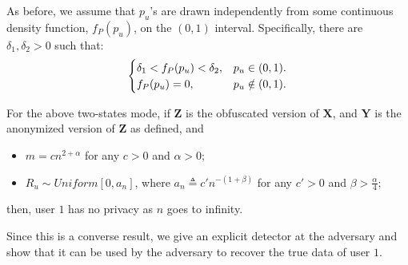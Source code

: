 As before, we assume that $p_u$'s are drawn independently from some continuous density function, $f_P(p_u)$, on the $(0,1)$ interval. Specifically, there are $\delta_1, \delta_2>0$ such that:%
\begin{equation}
\nonumber\begin{cases}
    \delta_1<f_P(p_u) <\delta_2, & p_u \in (0,1).\\
    f_P(p_u)=0, &  p _u\notin (0,1).
\end{cases}
\end{equation}

\begin{thm}\label{two_state_thm_converse}
For the above two-states mode, if $\textbf{Z}$ is the obfuscated version of $\textbf{X}$, and $\textbf{Y}$ is the anonymized version of $\textbf{Z}$ as defined, and
\begin{itemize}
	\item $m =cn^{2 +  \alpha}$ for any $c>0$ and $\alpha>0$;
	\item $R_u \sim Uniform [0, a_n]$, where $a_n \triangleq c'n^{-\left(1+\beta\right)}$ for any $c'>0$ and $\beta>\frac{\alpha}{4}$;
\end{itemize}
then, user $1$ has no privacy as $n$ goes to infinity.
\end{thm}

Since this is a converse result, we give an explicit detector at the adversary and show that it can be used by the adversary to recover the true data of user $1$.

